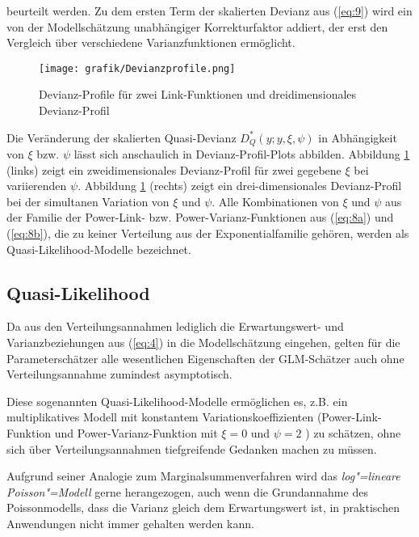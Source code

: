 beurteilt werden. Zu dem ersten Term der skalierten Devianz aus (\ref{eq:9}) wird ein von der Modellschätzung unabhängiger Korrekturfaktor addiert, der erst den Vergleich über verschiedene Varianzfunktionen ermöglicht.

\begin{figure}  %
	\centering
  \texttt{[image: grafik/Devianzprofile.png]}
      \caption{Devianz-Profile für zwei Link-Funktionen und dreidimensionales Devianz-Profil}
	\label{fig:Devianzprofile}
	
\end{figure} 	 



Die Veränderung der skalierten Quasi-Devianz $D^*_Q(y; y,\xi,\psi)$  in Abhängigkeit von $\xi$  bzw. $\psi$  lässt sich anschaulich in Devianz-Profil-Plots abbilden. Abbildung \ref{fig:Devianzprofile} (links) zeigt ein zweidimensionales Devianz-Profil für zwei gegebene $\xi$ bei variierenden $\psi$. Abbildung \ref{fig:Devianzprofile} (rechts) zeigt ein drei-dimensionales Devianz-Profil bei der simultanen Variation von $\xi$  und $\psi$.
Alle Kombinationen von $\xi$ und $\psi$  aus der Familie der Power-Link- bzw. Power-Varianz-Funktionen aus (\ref{eq:8a}) und (\ref{eq:8b}), die zu keiner Verteilung aus der Exponentialfamilie gehören, werden als Quasi-Likelihood-Modelle bezeichnet.


\subsection{Quasi-Likelihood}\label{QuasiLikelihood}

Da aus den Verteilungsannahmen lediglich die Erwartungswert- und Varianzbeziehungen aus (\ref{eq:4}) in die Modellschätzung eingehen, gelten für die Parameterschätzer alle wesentlichen Eigenschaften der GLM-Schätzer auch ohne Verteilungsannahme zumindest asymptotisch.

Diese sogenannten Quasi-Likelihood-Modelle ermöglichen es, z.B. ein multiplikatives Modell mit konstantem Variationskoeffizienten (Power-Link-Funktion und Power-Varianz-Funktion mit $\xi=0$  und $\psi=2$ ) zu schätzen, ohne sich über Verteilungsannahmen tiefgreifende Gedanken machen zu müssen.

Aufgrund seiner Analogie zum Marginalsummenverfahren wird das \textit{log"=lineare Poisson"=Modell} gerne herangezogen, auch wenn die Grundannahme des Poissonmodells, dass die Varianz gleich dem Erwartungswert ist, in praktischen Anwendungen nicht immer gehalten werden kann. 


